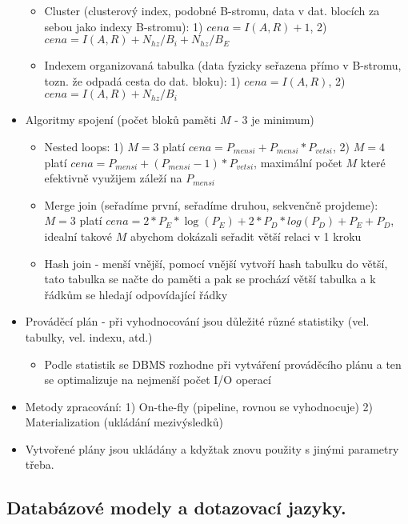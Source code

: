 \documentclass[a4paper,hidelinks]{article}
\begin{document}
\begin{itemize}
\begin{itemize}
        \item Cluster (clusterový index, podobné B-stromu, data v dat. blocích za sebou jako indexy B-stromu): 1) $cena=I(A,R)+1$, 2) $cena=I(A,R)+N_{hz}/B_i+N_{hz}/B_E$
        \item Indexem organizovaná tabulka (data fyzicky seřazena přímo v B-stromu, tozn. že odpadá cesta do dat. bloku): 1) $cena=I(A,R)$, 2) $cena=I(A,R)+N_{hz}/B_i$
    \end{itemize}
    \item Algoritmy spojení (počet bloků paměti $M$ - 3 je minimum) 
    \begin{itemize}
        \item Nested loops: 1) $M=3$ platí $cena=P_{mensi}+P_{mensi}*P_{vetsi}$, 2) $M=4$ platí $cena=P_{mensi}+(P_{mensi}-1)*P_{vetsi}$, maximální počet $M$ které efektivně využijem záleží na $P_{mensi}$
        \item Merge join (seřadíme první, seřadíme druhou, sekvenčně projdeme): $M=3$ platí $cena=2*P_E*\log(P_E)+2*P_D*log(P_D)+P_E+P_D$, idealní takové $M$ abychom dokázali seřadit větší relaci v 1 kroku
        \item Hash join - menší vnější, pomocí vnější vytvoří hash tabulku do větší, tato tabulka se načte do paměti a pak se prochází větší tabulka a k řádkům se hledají odpovídající řádky
    \end{itemize}
    \item Prováděcí plán - při vyhodnocování jsou důležité různé statistiky (vel. tabulky, vel. indexu, atd.)
        \begin{itemize}
            \item Podle statistik se DBMS rozhodne při vytváření prováděcího plánu a ten se optimalizuje na nejmenší počet I/O operací
        \end{itemize}
    \item Metody zpracování: 1) On-the-fly (pipeline, rovnou se vyhodnocuje) 2) Materialization (ukládání mezivýsledků)
    \item Vytvořené plány jsou ukládány a kdyžtak znovu použity s jinými parametry třeba.
\end{itemize}

\subsection{Databázové modely a dotazovací jazyky.}
\end{document}
